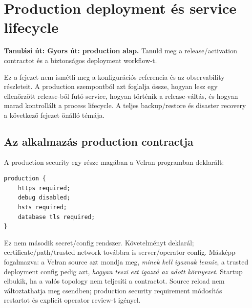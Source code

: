 \chapter{Production deployment és service lifecycle}

\noindent\textbf{Tanulási út: Gyors út: production alap.} Tanuld meg a release/activation contractot és a biztonságos deployment workflow-t.\par\medskip



Ez a fejezet nem ismétli meg a konfigurációs referencia és az observability részleteit. A production szempontból azt foglalja össze, hogyan lesz egy ellenőrzött release-ből futó service, hogyan történik a release-váltás, és hogyan marad kontrollált a process lifecycle. A teljes backup/restore és disaster recovery a következő fejezet önálló témája.

\section{Az alkalmazás production contractja}

A production security egy része magában a Velran programban deklarált:

\begin{lstlisting}[language=Velran]
production {
    https required;
    debug disabled;
    hsts required;
    database tls required;
}
\end{lstlisting}

Ez nem második secret/config rendszer. Követelményt deklarál; certificate/path/trusted network továbbra is server/operator config. Másképp fogalmazva: a Velran source azt mondja meg, \emph{minek kell igaznak lennie}, a trusted deployment config pedig azt, \emph{hogyan teszi ezt igazzá az adott környezet}. Startup elbukik, ha a valós topology nem teljesíti a contractot. Source reload nem változtathatja meg csendben; production security requirement módosítás restartot és explicit operator review-t igényel.

